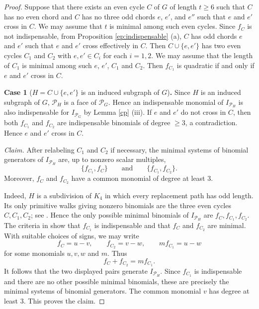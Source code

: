 \documentclass[12pt]{amsart}
\theoremstyle{definition}
\numberwithin{thm}{section}
\numberwithin{equation}{section}
\begin{document}
\begin{proof}
Suppose that there exists an even cycle $C$ of $G$ of length $t \ge 6$ such that
    $C$ has no even chord and $C$ has no three odd chords $e$, $e'$, and $e''$ such that $e $ and $e'$ cross in $C$.
    We may assume that $t$ is minimal among such even cycles.
    Since $f_C$ is not indispensable, from Proposition \ref{ep:indispensable} (a), $C$ has odd chords $e$ and $e'$ such that $e $ and $e'$ cross effectively in $C$.
    Then $C \cup \{e,e'\}$ has two even cycles $C_1$ and $C_2$ with $e, e' \in C_i$ for each $i=1,2$.
    We may assume that the length of $C_1$ is minimal among such $e$, $e'$, $C_1$ and $C_2$.  
    Then $f_{C_1}$ is quadratic if and only if $e$ and $e'$ cross in $C$.

\bigskip

\noindent
{\bf Case 1} ($H=C \cup \{e,e'\}$ is an induced subgraph of $G$){\bf .}
Since \(H\) is an induced subgraph of \(G\), \(\mathcal{P}_H\) is a face of \(\mathcal{P}_G\).
Hence an indispensable monomial of \(I_{\mathcal{P}_H}\) is also indispensable for
\(I_{\mathcal{P}_G}\) by Lemma \ref{cp} (iii).
    If $e$ and $e'$ do not cross in $C$, then both $f_{C_1}$ and $f_{C_2}$ are indispensable binomials of degree $\ge 3$, a contradiction.
    Hence $e$ and $e'$ cross in $C$.

\medskip \noindent \emph{Claim.} After relabeling \(C_1\) and \(C_2\) if necessary, the minimal systems of binomial generators of \(I_{\mathcal P_H}\) are, up to nonzero scalar multiples, \[ \{f_{C_1},f_C\} \qquad\text{and}\qquad \{f_{C_1},f_{C_2}\}. \] Moreover, \(f_C\) and \(f_{C_2}\) have a common monomial of degree at least \(3\). 

\medskip

Indeed, \(H\) is a subdivision of \(K_4\) in which every replacement path has odd length. Its only primitive walks giving nonzero binomials are the three even cycles \(C,C_1,C_2\); see \cite[Theorem~3.1]{RTT}. Hence the only possible minimal binomials of \(I_{\mathcal P_H}\) are \(f_C,f_{C_1},f_{C_2}\). The criteria in \cite[Theorems~4.13 and 4.14 and Proposition~4.10]{RTT} show that \(f_{C_1}\) is indispensable and that \(f_C\) and \(f_{C_2}\) are minimal. With suitable choices of signs, we may write \[ f_C=u-v,\qquad f_{C_2}=v-w,\qquad m f_{C_1}=u-w \] for some monomials \(u,v,w\) and \(m\). Thus \[ f_C+f_{C_2}=m f_{C_1}. \] It follows that the two displayed pairs generate \(I_{\mathcal P_H}\). Since \(f_{C_1}\) is indispensable and there are no other possible minimal binomials, these are precisely the minimal systems of binomial generators. The common monomial \(v\) has degree at least \(3\). This proves the claim. 


\end{proof}
\end{document}
